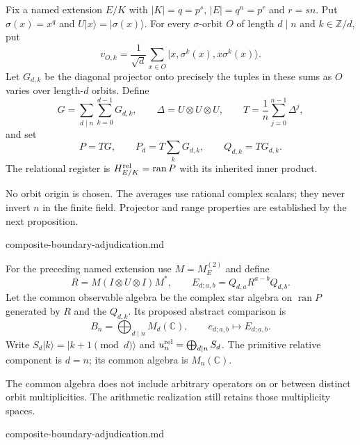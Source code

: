 \begin{definition}
Fix a named extension $E/K$ with $|K|=q=p^s$, $|E|=q^n=p^r$ and $r=sn$.
Put $\sigma(x)=x^q$ and $U|x\rangle=|\sigma(x)\rangle$. For every
$\sigma$-orbit $O$ of length $d\mid n$ and $k\in\mathbb Z/d$, put
\[
 v_{O,k}=\frac1{\sqrt d}\sum_{x\in O}
       |x,\sigma^k(x),x\sigma^k(x)\rangle.
\]
Let $G_{d,k}$ be the diagonal projector onto precisely the tuples in these
sums as $O$ varies over length-$d$ orbits. Define
\[
 G=\sum_{d\mid n}\sum_{k=0}^{d-1}G_{d,k},\qquad
 \Delta=U\otimes U\otimes U,\qquad
 T=\frac1n\sum_{j=0}^{n-1}\Delta^j,
\]
and set
\[
 P=TG,\qquad P_d=T\sum_kG_{d,k},\qquad Q_{d,k}=TG_{d,k}.
\]
The relational register is $H_{E/K}^{\rm rel}=\operatorname{ran}P$ with
its inherited inner product.
\end{definition}
\begin{scope}
No orbit origin is chosen. The averages use rational complex scalars;
they never invert $n$ in the finite field. Projector and range properties
are established by the next proposition.
\end{scope}
{composite-boundary-adjudication.md}

\begin{definition}
For the preceding named extension use $M=M_E^{(2)}$ and define
\[
 R=M(I\otimes U\otimes I)M^*,\qquad
 E_{d;a,b}=Q_{d,a}R^{a-b}Q_{d,b}.
\]
Let the common observable algebra be the complex star algebra on
$\operatorname{ran}P$ generated by $R$ and the $Q_{d,k}$. Its proposed
abstract comparison is
\[
 B_n=\bigoplus_{d\mid n}M_d(\mathbb C),\qquad
 e_{d;a,b}\longmapsto E_{d;a,b}.
\]
Write $S_d|k\rangle=|k+1\pmod d\rangle$ and
$u_n^{\rm rel}=\bigoplus_{d\mid n}S_d$. The primitive relative component
is $d=n$; its common algebra is $M_n(\mathbb C)$.
\end{definition}
\begin{scope}
The common algebra does not include arbitrary operators on or between
distinct orbit multiplicities. The arithmetic realization still retains
those multiplicity spaces.
\end{scope}
{composite-boundary-adjudication.md}

